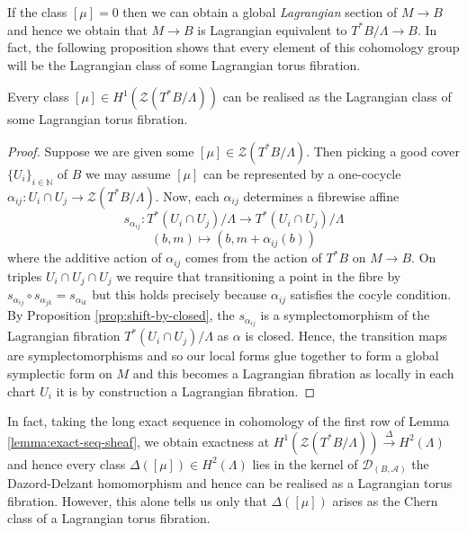 If the class $[\mu] = 0$ then we can obtain a global \emph{Lagrangian} section
of $M \to B$ and hence we obtain that $M \to B$ is Lagrangian equivalent to
$T^*B/\Lambda \to B$. In fact, the following proposition shows that every
element of this cohomology group will be the Lagrangian class of some
Lagrangian torus fibration.

\begin{prop}\label{prop:every:lagrangian-class}
    Every class $[\mu] \in H^1(\mathcal{Z}(T^*B/\Lambda))$ can be realised as the Lagrangian class of some Lagrangian torus fibration.
\end{prop}

\begin{proof}
    Suppose we are given some $[\mu] \in \mathcal{Z}(T^*B/\Lambda)$. Then picking a good cover $\{U_i\}_{i \in \mathbb{N}}$ of $B$ we may assume $[\mu]$
    can be represented by a one-cocycle $\alpha_{ij} : U_i \cap U_j \to \mathcal{Z}(T^*B/\Lambda)$. Now, each $\alpha_{ij}$ determines a fibrewise affine
    $$
        s_{\alpha_{ij}}: T^*(U_i \cap U_j)/\Lambda\to T^*(U_i \cap U_j)/\Lambda
    $$
    $$
        (b, m) \mapsto (b, m + \alpha_{ij}(b))
    $$
    where the additive action of $\alpha_{ij}$ comes from the action of $T^*B$ on $M \to B$. On triples $U_i \cap U_j \cap U_j$ we require that
    transitioning a point in the fibre by $s_{\alpha_{ij}} \circ s_{\alpha_{jk}} = s_{\alpha_{ik}}$ but this holds precisely because $\alpha_{ij}$ satisfies the cocyle condition.
    By Proposition \ref{prop:shift-by-closed}, the  $s_{\alpha_{ij}}$ is a symplectomorphism
    of the Lagrangian fibration $T^*(U_i \cap U_j)/\Lambda$ as $\alpha$ is closed. Hence, the transition maps are symplectomorphisms and so our local forms glue together
    to form a global symplectic form on $M$ and this becomes a Lagrangian fibration as locally in each chart $U_i$ it is by construction a Lagrangian fibration.
\end{proof}

\begin{remark}
    In fact,
    taking the long exact sequence in cohomology of the first row of Lemma
    \ref{lemma:exact-seq-sheaf}, we obtain exactness at
    $H^1(\mathcal{Z}(T^*B/\Lambda)) \xrightarrow{\Delta} H^2(\Lambda)$ and hence
    every class $\Delta([\mu]) \in H^2(\Lambda)$ lies in the kernel of
    $\mathcal{D}_{(B, \mathcal{A})}$ the Dazord-Delzant homomorphism and hence can
    be realised as a Lagrangian torus fibration. However, this alone tells us only that $\Delta([\mu])$ arises
    as the Chern class of a Lagrangian torus fibration.
\end{remark}

